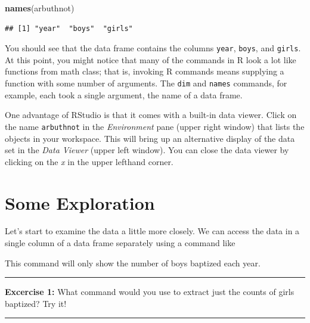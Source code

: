 \documentclass[]{book}
\newenvironment{Shaded}{\begin{snugshade}}{\end{snugshade}}
\newcommand{\KeywordTok}[1]{\textcolor[rgb]{0.13,0.29,0.53}{\textbf{{#1}}}}
\newcommand{\NormalTok}[1]{{#1}}
\theoremstyle{definition}
\theoremstyle{definition}
\theoremstyle{definition}
\theoremstyle{remark}
\begin{document}
\begin{Shaded}
\begin{Highlighting}[]
\KeywordTok{names}\NormalTok{(arbuthnot)}
\end{Highlighting}
\end{Shaded}

\begin{verbatim}
## [1] "year"  "boys"  "girls"
\end{verbatim}

You should see that the data frame contains the columns \texttt{year},
\texttt{boys}, and \texttt{girls}. At this point, you might notice that
many of the commands in R look a lot like functions from math class;
that is, invoking R commands means supplying a function with some number
of arguments. The \texttt{dim} and \texttt{names} commands, for example,
each took a single argument, the name of a data frame.

One advantage of RStudio is that it comes with a built-in data viewer.
Click on the name \texttt{arbuthnot} in the \emph{Environment} pane
(upper right window) that lists the objects in your workspace. This will
bring up an alternative display of the data set in the \emph{Data
Viewer} (upper left window). You can close the data viewer by clicking
on the \emph{x} in the upper lefthand corner.

\section{Some Exploration}\label{some-exploration}

Let's start to examine the data a little more closely. We can access the
data in a single column of a data frame separately using a command like

\begin{Shaded}
\end{Shaded}

This command will only show the number of boys baptized each year.

\begin{center}\rule{0.5\linewidth}{\linethickness}\end{center}

\textbf{Excercise 1:} What command would you use to extract just the
counts of girls baptized? Try it!

\begin{center}\rule{0.5\linewidth}{\linethickness}\end{center}
\end{document}

